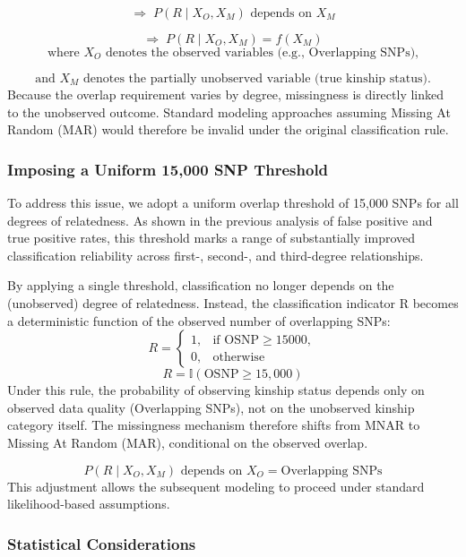 \documentclass[
]{ajs}
\begin{document}
\[
\Rightarrow \; P(R \mid X_O, X_M) \text{ depends on } X_M
\]

\[
\Rightarrow \; P(R \mid X_O, X_M) = f(X_M)
\] \[
\text{where } X_O \text{ denotes the observed variables (e.g., Overlapping SNPs),}
\]

\[
\text{and } X_M \text{ denotes the partially unobserved variable (true kinship status).}
\] Because the overlap requirement varies by degree, missingness is
directly linked to the unobserved outcome. Standard modeling approaches
assuming Missing At Random (MAR) would therefore be invalid under the
original classification rule.

\subsubsection{Imposing a Uniform 15,000 SNP
Threshold}\label{imposing-a-uniform-15000-snp-threshold}

To address this issue, we adopt a uniform overlap threshold of 15,000
SNPs for all degrees of relatedness. As shown in the previous analysis
of false positive and true positive rates, this threshold marks a range
of substantially improved classification reliability across first-,
second-, and third-degree relationships.

By applying a single threshold, classification no longer depends on the
(unobserved) degree of relatedness. Instead, the classification
indicator R becomes a deterministic function of the observed number of
overlapping SNPs: \[
R =
\begin{cases}
1, & \text{if } \text{OSNP} \ge 15000, \\
0, & \text{otherwise}
\end{cases}
\] \[
R = \mathbb{I}\!\left(\mathrm{OSNP} \ge 15{,}000\right)
\] Under this rule, the probability of observing kinship status depends
only on observed data quality (Overlapping SNPs), not on the unobserved
kinship category itself. The missingness mechanism therefore shifts from
MNAR to Missing At Random (MAR), conditional on the observed overlap.

\[
P(R \mid X_O, X_M) \text{ depends on } X_O = \text{Overlapping SNPs}
\] This adjustment allows the subsequent modeling to proceed under
standard likelihood-based assumptions.

\subsubsection{Statistical
Considerations}\label{statistical-considerations}
\end{document}
